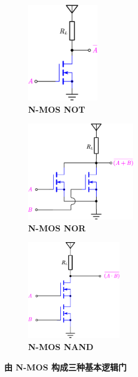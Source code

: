 \documentclass[UTF8]{report}
\theoremstyle{MyLineTheoremStyle} %
\theoremstyle{MyBlockTheoremStyle} %
\theoremstyle{MySubsubsectionStyle} %
\begin{document}
\begin{figure}[H]\centering
\begin{subfigure}[t]{0.33\columnwidth}\centering
    \includegraphics[height=120pt]{assets/2/NMOS NOT.pdf}
    \caption{\bfseries N-MOS NOT }
\end{subfigure}\hfill
\begin{subfigure}[t]{0.33\columnwidth}\centering
    \includegraphics[height=120pt]{assets/2/NMOS NOR.pdf}
    \caption{\bfseries N-MOS NOR }
\end{subfigure}
\begin{subfigure}[t]{0.33\columnwidth}\centering
    \includegraphics[height=120pt]{assets/2/NMOS NAND.pdf}
    \caption{\bfseries N-MOS NAND }
\end{subfigure}
\caption{\bfseries 由 N-MOS 构成三种基本逻辑门 }\label{由 N-MOS 构成三种基本逻辑门}
\end{figure}
\end{document}
